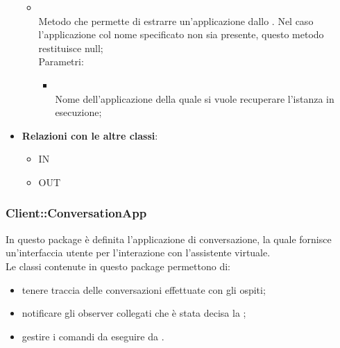 \begin{itemize}
\begin{itemize}
\begin{itemize}
		\end{itemize}
		\item[]  \\		Metodo che permette di estrarre un'applicazione dallo . Nel caso l'applicazione col nome specificato non sia presente, questo metodo restituisce null;\\
		Parametri:
		\begin{itemize}
			\item {} \\
			Nome dell'applicazione della quale si vuole recuperare l'istanza in esecuzione;
		\end{itemize}
	\end{itemize}
	\item \textbf{Relazioni con le altre classi}:
	\begin{itemize}
		\item IN \hyperlink{Manager_label}{}
		\item OUT \hyperlink{Application_label}{}
	\end{itemize}
\end{itemize}
\FloatBarrier

\subsubsection{Client::ConversationApp}
In questo package è definita l'applicazione di conversazione, la quale fornisce un'interfaccia utente per l'interazione con l'assistente virtuale.\\
Le classi contenute in questo package permettono di:
\begin{itemize}
\item tenere traccia delle conversazioni effettuate con gli ospiti;
\item notificare gli observer collegati che è stata decisa la ;
\item gestire i comandi da eseguire da .
\end{itemize}

